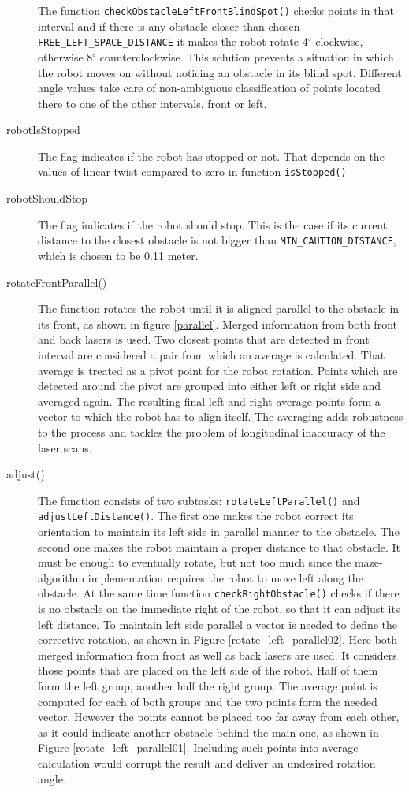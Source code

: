 \begin{description}
The function \texttt{checkObstacleLeftFrontBlindSpot()} checks points in that interval and if there is any obstacle closer than chosen \texttt{FREE\_LEFT\_SPACE\_DISTANCE} it makes the robot rotate 4$^{\circ}$ clockwise, otherwise 8$^{\circ}$ counterclockwise. This solution prevents a situation in which the robot moves on without noticing an obstacle in its blind spot. Different angle values take care of non-ambiguous classification of points located there to one of the other intervals, front or left.
\item[robotIsStopped] The flag indicates if the robot has stopped or not. That depends on the values of linear twist compared to zero in function \texttt{isStopped()}
\item[robotShouldStop] The flag indicates if the robot should stop. This is the case if its current distance to the closest obstacle is not bigger than \texttt{MIN\_CAUTION\_DISTANCE}, which is chosen to be 0.11 meter.
\item[rotateFrontParallel()] The function rotates the robot until it is aligned parallel to the obstacle in its front, as shown in figure \ref{parallel}. Merged information from both front and back lasers is used. Two closest points that are detected in front interval are considered a pair from which an average is calculated. That average is treated as a pivot point for the robot rotation. Points which are detected around the pivot are grouped into either left or right side and averaged again. The resulting final left and right average points form a vector to which the robot has to align itself. The averaging adds robustness to the process and tackles the problem of longitudinal inaccuracy of the laser scans.
\item[adjust()] The function consists of two subtasks: \texttt{rotateLeftParallel()} and \\ \texttt{adjustLeftDistance()}. The first one makes the robot correct its orientation to maintain its left side in parallel manner to the obstacle. The second one makes the robot maintain a proper distance to that obstacle. It must be enough to eventually rotate, but not too much since the maze-algorithm implementation requires the robot to move left along the obstacle. At the same time function \texttt{checkRightObstacle()} checks if there is no obstacle on the immediate right of the robot, so that it can adjust its left distance. To maintain left side parallel a vector is needed to define the corrective rotation, as shown in Figure \ref{rotate_left_parallel02}. Here both merged information from front as well as back lasers are used. It considers those points that are placed on the left side of the robot. Half of them form the left group, another half the right group. The average point is computed for each of both groups and the two points form the needed vector. However the points cannot be placed too far away from each other, as it could indicate another obstacle behind the main one, as shown in Figure \ref{rotate_left_parallel01}. Including such points into average calculation would corrupt the result and deliver an undesired rotation angle.

\end{description}
